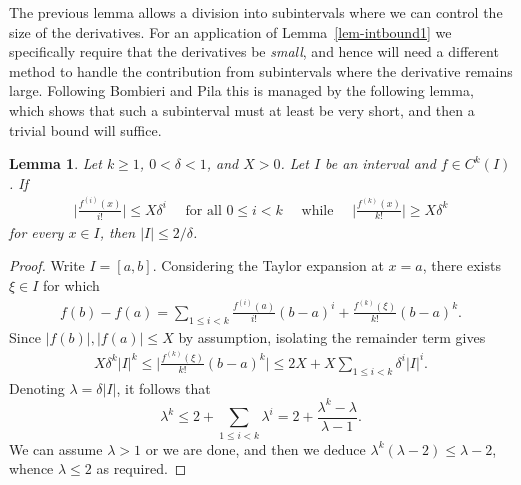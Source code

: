 \documentclass[12pt]{amsart}
\newcommand{\1}{{\mathbf 1}}
\newtheorem{lemma}[theorem]{Lemma}
\theoremstyle{remark}
\theoremstyle{definition}
\begin{document}
The previous lemma allows a division into subintervals where we can control the size of the derivatives. For an application of Lemma~\ref{lem-intbound1} we specifically require that the derivatives be \emph{small}, and hence will need a different method to handle the contribution from subintervals where the derivative remains large. Following Bombieri and Pila this is managed by the following lemma, which shows that such a subinterval must at least be very short, and then a trivial bound will suffice.

\begin{lemma}\label{lem:7}
Let $k\geq 1$, $0<\delta<1$, and $X>0$. Let $I$ be an interval and $f\in C^k(I)$. If
\begin{align*}
\Big|\frac{f^{(i)}(x)}{i!}\Big| \le X\delta^i
\quad\textrm{ for all }0\leq i<k
\quad\textrm{ while }\quad\Big|\frac{f^{(k)}(x)}{k!}\Big| \ge X\delta^k
\end{align*}
for every $x\in I$, then $\lvert I\rvert \leq 2/\delta$.
\end{lemma}
\begin{proof}
Write $I=[a,b]$. Considering the Taylor expansion at $x=a$, there exists $\xi\in I$ for which
\begin{align*}
f(b)-f(a) =\sum_{1\le i<k} \frac{f^{(i)}(a)}{i!}(b-a)^i + \frac{f^{(k)}(\xi)}{k!}(b-a)^k.
\end{align*}
Since $|f(b)|,|f(a)|\le X$ by assumption, isolating the remainder term gives
\begin{align*}
X\delta^k\lvert I\rvert^k \le \bigg|\frac{f^{(k)}(\xi)}{k!}(b-a)^k\bigg| \le 2X+ X\sum_{1\le i<k}\delta^i|I|^i.
\end{align*}
Denoting $\lambda = \delta \lvert I\rvert$, it follows that
\[\lambda^k \le 2+ \sum_{1\le i<k}\lambda^i= 2+\frac{\lambda^k-\lambda}{\lambda -1}.\]
We can assume $\lambda >1$ or we are done, and then we deduce $\lambda^k(\lambda-2)\leq \lambda -2$, whence $\lambda \leq 2$ as required.
\end{proof}
\end{document}
